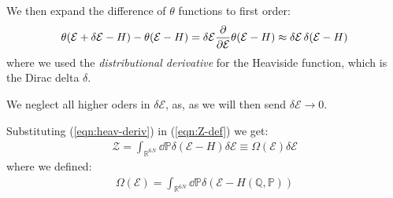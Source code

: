 \documentclass[../template.tex]{subfiles}
\begin{document}
\medskip

We then expand the difference of $\theta$ functions to first order:
\begin{align} \label{eqn:heav-deriv}
    \theta(\mathcal{E}+\delta \mathcal{E}-H) - \theta(\mathcal{E}-H) = \delta \mathcal{E} \pdv{\mathcal{E}} \theta(\mathcal{E}-H) \approx \delta \mathcal{E}\, \delta(\mathcal{E}-H)
\end{align} 
where we used the \textit{distributional derivative} for the Heaviside function, which is the Dirac delta $\delta$. %

We neglect all higher oders in $\delta\mathcal{E}$, as, as we will then send $\delta \mathcal{E} \to 0$.

\medskip

Substituting (\ref{eqn:heav-deriv}) in (\ref{eqn:Z-def}) we get:
\begin{align*}
    \mathcal{Z}= \int_{\mathbb{R}^{6N}} \dd{\mathbb{P}} \delta(\mathcal{E}-H)\delta \mathcal{E} \equiv \Omega(\mathcal{E}) \delta \mathcal{E}
\end{align*}
where we defined:
\begin{align*}
    \Omega(\mathcal{E}) = \int_{\mathbb{R}^{6N}} \dd{\mathbb{P}} \delta(\mathcal{E}-H(\mathbb{Q},\mathbb{P}))
\end{align*}
\end{document}
